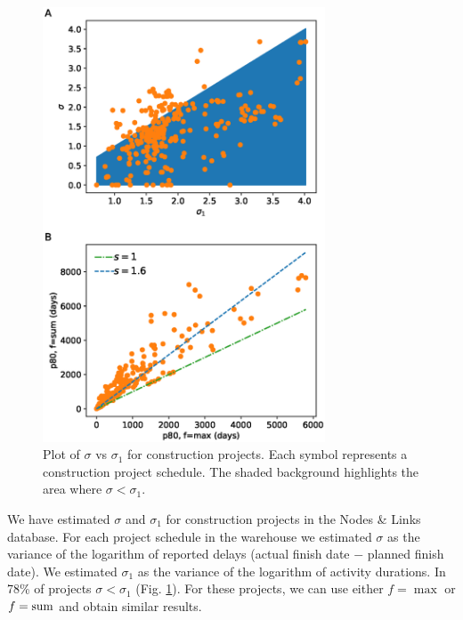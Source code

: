 \documentclass[reprint,aps,prl,amsmath,amssymb,superscriptaddress,showpacs]{revtex4-1}
\begin{document}
\begin{figure}[t]
\includegraphics[width=3.3in]{fig.sigma_vs_sigma1.eps}
\caption{Plot of $\sigma$ vs $\sigma_1$ for construction projects. Each symbol represents a construction project schedule. The shaded background highlights the area where $\sigma<\sigma_1$.}
\label{fig4}
\end{figure}

We have estimated $\sigma$ and $\sigma_1$ for construction projects in the Nodes \& Links database. For each project schedule in the warehouse we estimated $\sigma$ as the variance of the logarithm of reported delays (actual finish date $-$ planned finish date). We estimated $\sigma_1$ as the variance of the logarithm of activity durations. In 78\% of projects $\sigma<\sigma_1$ (Fig. \ref{fig4}). For these projects, we can use either $f={\max}$ or $f={\rm sum}$ and obtain similar results.
\end{document}
